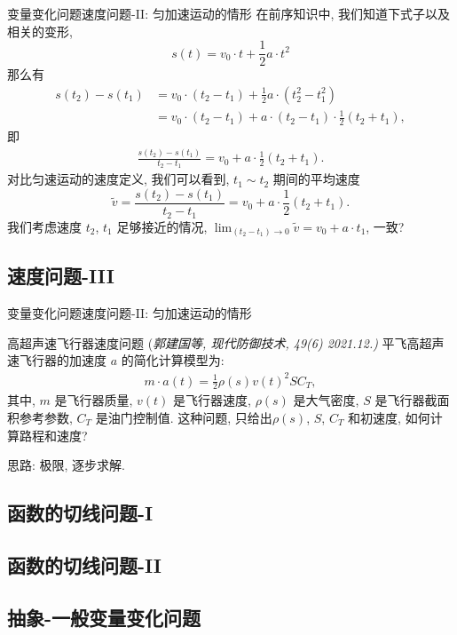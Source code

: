 \documentclass[
10pt,
aspectratio=43,
]{beamer}
\begin{document}
\begin{frame}{变量变化问题}{速度问题-II: 匀加速运动的情形}
	在前序知识中, 我们知道下式子以及相关的变形,
	\[
		s(t) = v_0\cdot t+ \frac{1}{2}a\cdot t^2
	\]
	那么有
	\begin{align*}
		s(t_2) - s(t_1) &= v_0\cdot (t_2-t_1)+ \frac{1}{2}a\cdot (t_2^2-t_1^2)\\
		&=v_0\cdot(t_2-t_1) + a\cdot(t_2-t_1) \cdot \frac{1}{2}(t_2+t_1),
	\end{align*}
	即
	\begin{align*}
		\frac{s(t_2) - s(t_1)}{t_2-t_1} = v_0 + a\cdot \frac{1}{2}(t_2+t_1).
	\end{align*}
	对比匀速运动的速度定义, 我们可以看到, $t_1\sim t_2$ 期间的平均速度
	\begin{equation*}
		\tilde{v}=\frac{s(t_2) - s(t_1)}{t_2-t_1} = v_0 + a\cdot \frac{1}{2}(t_2+t_1).
	\end{equation*}
	我们考虑速度 $t_2$, $t_1$ 足够接近的情况, $\lim_{(t_2-t_1)\to 0}\tilde{v}=v_0+a\cdot t_1$, 一致?
\end{frame}

\subsection{速度问题-III} %
\begin{frame}{变量变化问题}{速度问题-II: 匀加速运动的情形}
	\begin{exampleblock}{高超声速飞行器速度问题 \color{blue}(\small{\it 郭建国等, {现代防御技术}, 49(6) 2021.12.)}}
		平飞高超声速飞行器的加速度 $a$ 的简化计算模型为: 
		\begin{align*}
			m\cdot a(t)= \frac{1}{2}\rho(s) v(t)^2 S C_T,
		\end{align*}
		其中, $m$ 是飞行器质量, $v(t)$ 是飞行器速度, $\rho(s)$ 是大气密度, $S$ 是飞行器截面积参考参数, $C_T$ 是油门控制值. 这种问题, 只给出$\rho(s)$, $S$, $C_T$ 和初速度, 如何计算路程和速度?	
	\end{exampleblock}
	思路: 极限, 逐步求解.
\end{frame}


\subsection{函数的切线问题-I} %
\subsection{函数的切线问题-II} %
\subsection{抽象-一般变量变化问题}
\end{document}

